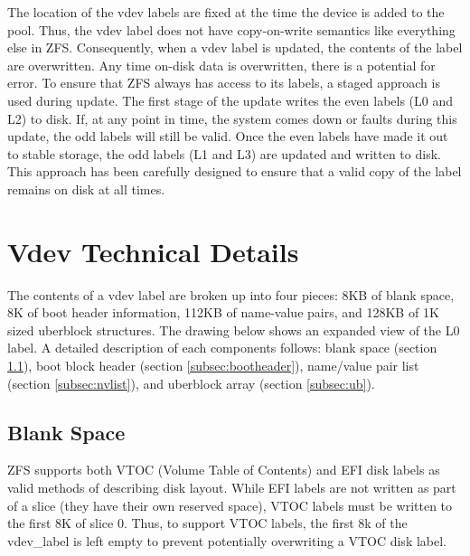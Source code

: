 The location of the vdev labels are fixed
at the time the device is added to the pool.
Thus,
the vdev label does not have copy-on-write semantics like everything else in ZFS.
Consequently,
when a vdev label is updated,
the contents of the label are overwritten.
Any time on-disk data is overwritten,
there is a potential for error.
To ensure that ZFS always has access to its labels,
a staged approach is used during update.
The first stage of the update writes the even labels (L0 and L2) to disk.
If, at any point in time,
the system comes down or faults during this update,
the odd labels will still be valid.
Once the even labels have made it out to stable storage,
the odd labels (L1 and L3) are updated and written to disk.
This approach has been carefully designed to ensure that
a valid copy of the label remains on disk at all times.

\section{Vdev Technical Details}\label{sec:vdev_detail}
The contents of a vdev label are broken up into four pieces:
8KB of blank space,
8K of boot header information,
112KB of name-value pairs,
and 128KB of 1K sized uberblock structures.
The drawing below shows an expanded view of the L0 label.
A detailed description of each components follows:
blank space
(section \ref{subsec:blankspace}),
boot block header
(section \ref{subsec:bootheader}),
name/value pair list
(section \ref{subsec:nvlist}),
and
uberblock array
(section \ref{subsec:ub}).

\subsection{Blank Space}\label{subsec:blankspace}

ZFS supports both VTOC (Volume Table of Contents) and EFI disk labels
as valid methods of describing disk layout.
While EFI labels are not written as part of a slice
(they have their own reserved space),
VTOC labels must be written to the first 8K of slice 0.
Thus,
to support VTOC labels,
the first 8k of the vdev\_label is left empty to prevent potentially overwriting a VTOC disk label.

